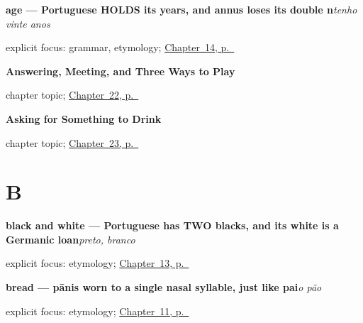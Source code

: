 \noindent\begin{minipage}[t]{\linewidth}
\raggedright
\textbf{age — Portuguese HOLDS its years, and annus loses its double n}\enspace\emph{tenho vinte anos}\par
\footnotesize explicit focus: grammar, etymology; \hyperref[ch:pt-having-and-age]{Chapter~14, p.~\pageref*{ch:pt-having-and-age}}
\end{minipage}\par\smallskip

\noindent\begin{minipage}[t]{\linewidth}
\raggedright
\textbf{Answering, Meeting, and Three Ways to Play}\par
\footnotesize chapter topic; \hyperref[ch:pt-answering-meeting-playing]{Chapter~22, p.~\pageref*{ch:pt-answering-meeting-playing}}
\end{minipage}\par\smallskip

\noindent\begin{minipage}[t]{\linewidth}
\raggedright
\textbf{Asking for Something to Drink}\par
\footnotesize chapter topic; \hyperref[ch:pt-coffee-tea-milk]{Chapter~23, p.~\pageref*{ch:pt-coffee-tea-milk}}
\end{minipage}\par\smallskip

\section*{B}

\noindent\begin{minipage}[t]{\linewidth}
\raggedright
\textbf{black and white — Portuguese has TWO blacks, and its white is a Germanic loan}\enspace\emph{preto, branco}\par
\footnotesize explicit focus: etymology; \hyperref[ch:pt-colours]{Chapter~13, p.~\pageref*{ch:pt-colours}}
\end{minipage}\par\smallskip

\noindent\begin{minipage}[t]{\linewidth}
\raggedright
\textbf{bread — pānis worn to a single nasal syllable, just like pai}\enspace\emph{o pão}\par
\footnotesize explicit focus: etymology; \hyperref[ch:pt-bread-water-wine]{Chapter~11, p.~\pageref*{ch:pt-bread-water-wine}}
\end{minipage}\par\smallskip

